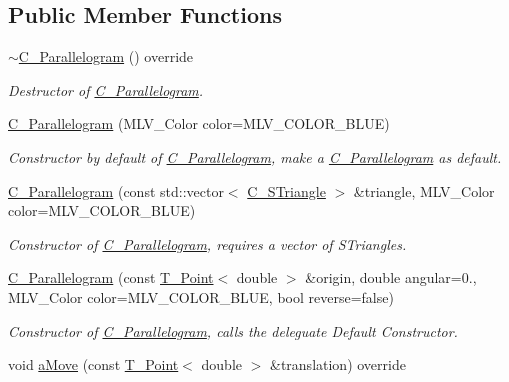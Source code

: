 \subsection*{Public Member Functions}
\begin{DoxyCompactItemize}
\item 
\hyperlink{classC__Parallelogram_a2d7af48f3a26e8e07031e7c147a084a3}{$\sim$\+C\+\_\+\+Parallelogram} () override
\begin{DoxyCompactList}\small\item\em Destructor of \hyperlink{classC__Parallelogram}{C\+\_\+\+Parallelogram}. \end{DoxyCompactList}\item 
\hyperlink{classC__Parallelogram_a85d543d3a3a118676e7e47cff7ce82be}{C\+\_\+\+Parallelogram} (M\+L\+V\+\_\+\+Color color=M\+L\+V\+\_\+\+C\+O\+L\+O\+R\+\_\+\+B\+L\+UE)
\begin{DoxyCompactList}\small\item\em Constructor by default of \hyperlink{classC__Parallelogram}{C\+\_\+\+Parallelogram}, make a \hyperlink{classC__Parallelogram}{C\+\_\+\+Parallelogram} as default. \end{DoxyCompactList}\item 
\hyperlink{classC__Parallelogram_a6e31f5dcaf076ca4b745c0b0108bb809}{C\+\_\+\+Parallelogram} (const std\+::vector$<$ \hyperlink{classC__STriangle}{C\+\_\+\+S\+Triangle} $>$ \&triangle, M\+L\+V\+\_\+\+Color color=M\+L\+V\+\_\+\+C\+O\+L\+O\+R\+\_\+\+B\+L\+UE)
\begin{DoxyCompactList}\small\item\em Constructor of \hyperlink{classC__Parallelogram}{C\+\_\+\+Parallelogram}, requires a vector of S\+Triangles. \end{DoxyCompactList}\item 
\hyperlink{classC__Parallelogram_ab054e5329d09c5b01f2ffaf3da51d053}{C\+\_\+\+Parallelogram} (const \hyperlink{classT__Point}{T\+\_\+\+Point}$<$ double $>$ \&origin, double angular=0., M\+L\+V\+\_\+\+Color color=M\+L\+V\+\_\+\+C\+O\+L\+O\+R\+\_\+\+B\+L\+UE, bool reverse=false)
\begin{DoxyCompactList}\small\item\em Constructor of \hyperlink{classC__Parallelogram}{C\+\_\+\+Parallelogram}, calls the deleguate Default Constructor. \end{DoxyCompactList}\item 
void \hyperlink{classC__Parallelogram_ac77ea776b24c551114d84eaf147f6977}{a\+Move} (const \hyperlink{classT__Point}{T\+\_\+\+Point}$<$ double $>$ \&translation) override

\end{DoxyCompactItemize}
